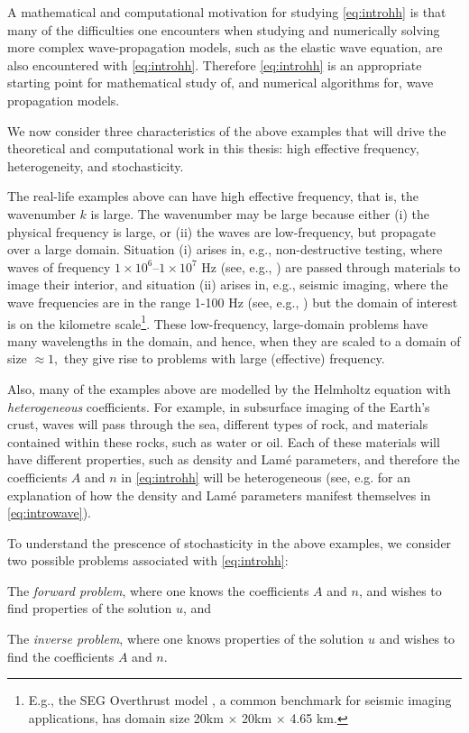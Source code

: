 A mathematical and computational motivation for studying \eqref{eq:introhh} is that many of the difficulties one encounters when studying and numerically solving more complex wave-propagation models, such as the elastic wave equation, are also encountered with \eqref{eq:introhh}. Therefore \eqref{eq:introhh} is an appropriate starting point for mathematical study of, and numerical algorithms for, wave propagation models.

We now consider three characteristics of the above examples that will drive the theoretical and computational work in this thesis: high effective frequency, heterogeneity, and stochasticity.

The real-life examples above can have high effective frequency, that is, the wavenumber $k$ is large. The wavenumber may be large because either (i) the physical frequency is large, or (ii) the waves are low-frequency, but propagate over a large domain. Situation (i) arises in, e.g., non-destructive testing, where waves of frequency $1\times10^6$--$1\times10^7$ Hz (see, e.g., \cite{BS:14}) are passed through materials to image their interior, and situation (ii) arises in, e.g., seismic imaging, where the wave frequencies are in the range 1-100 Hz (see, e.g., \cite{Sc}) but the domain of interest is on the kilometre scale\footnote{E.g., the SEG Overthrust model \cite{AmBrKu:97}, a common benchmark for seismic imaging applications, has domain size 20km $\times$ 20km $\times$ 4.65 km.}. These low-frequency, large-domain problems have many wavelengths in the domain, and hence, when they are scaled to a domain of size $\approx 1,$ they give rise to problems with large (effective) frequency.

Also, many of the examples above are modelled by the Helmholtz equation with \emph{heterogeneous} coefficients. For example, in subsurface imaging of the Earth's crust, waves will pass through the sea, different types of rock, and materials contained within these rocks, such as water or oil. Each of these materials will have different properties, such as density and Lam\'e parameters, and therefore the coefficients $A$ and $n$ in \eqref{eq:introhh} will be heterogeneous (see, e.g. \cite[Section 1.2.4]{Ch:15} for an explanation of how the density and Lam\'e parameters manifest themselves in \eqref{eq:introwave}).

To understand the prescence of stochasticity in the above examples, we consider two possible problems associated with \eqref{eq:introhh}:
\ben
\item The \emph{forward problem}, where one knows the coefficients $A$ and $n$, and wishes to find properties of the solution $u$, and
\item The \emph{inverse problem}, where one knows properties of the solution $u$ and wishes to find the coefficients $A$ and $n$.
  \een

